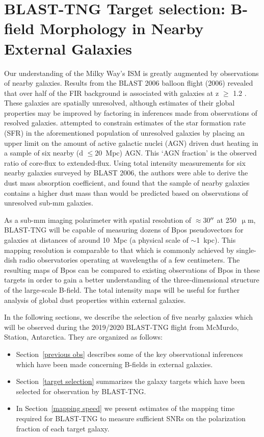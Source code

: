 \chapter{BLAST-TNG Target selection: B-field Morphology in Nearby External Galaxies}\label{galaxies}

Our understanding of the Milky Way's ISM is greatly augmented by observations of nearby galaxies. Results from the BLAST 2006 balloon flight (2006) revealed that over half of the FIR background is associated with galaxies at z $\geq$ 1.2 \citep{blast2006}. These galaxies are spatially unresolved, although estimates of their global properties may be improved by factoring in inferences made from observations of resolved galaxies. \citet{blastresolved} attempted to constrain estimates of the star formation rate (SFR) in the aforementioned population of unresolved galaxies by placing an upper limit on the amount of active galactic nuclei (AGN) driven dust heating in a sample of six nearby (d $\leq{20}$~Mpc) AGN\@. This `AGN fraction' is the observed ratio of core-flux to extended-flux. Using total intensity measurements for six nearby galaxies surveyed by BLAST 2006, the authors were able to derive the dust mass absorption coefficient, and found that the sample of nearby galaxies contains a higher dust mass than would be predicted based on observations of unresolved sub-mm galaxies.

As a sub-mm imaging polarimeter with spatial resolution of $\approx$30$\operatorname{^{\prime\prime}}$ at 250~$\upmu$m, BLAST-TNG will be capable of measuring dozens of \gls{Bpos} pseudovectors for galaxies at distances of around 10~Mpc (a physical scale of $\sim$1~kpc). This mapping resolution is comparable to that which is commonly achieved by single-dish radio observatories operating at wavelengths of a few centimeters. The resulting maps of \gls{Bpos} can be compared to existing observations of \gls{Bpos} in these targets in order to gain a better understanding of the three-dimensional structure of the large-scale B-field. The total intensity maps will be useful for further analysis of global dust properties within external galaxies.

In the following sections, we describe the selection of five nearby galaxies which will be observed during the 2019/2020 BLAST-TNG flight from McMurdo, Station, Antarctica. They are organized as follows:

\begin{itemize}[nosep]
  \item Section~\ref{previous obs} describes some of the key observational inferences which have been made concerning B-fields in external galaxies.
  \item Section~\ref{target selection} summarizes the galaxy targets which have been selected for observation by BLAST-TNG\@.
  \item In Section~\ref{mapping speed} we present estimates of the mapping time required for BLAST-TNG to measure sufficient SNRs on the polarization fraction of each target galaxy.
\end{itemize}

